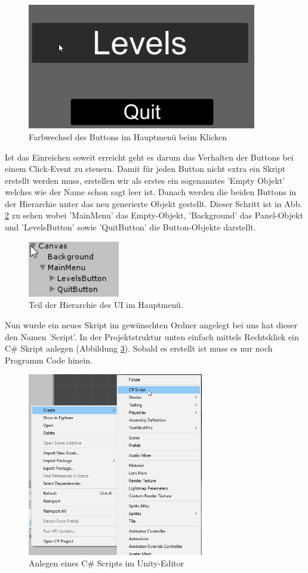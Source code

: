   \begin{figure}[H]
  	\centering
  	\includegraphics[width=10cm]{images/ButtonsClicked.png}
  	\caption{Farbwechsel des Buttons im Hauptmenü beim Klicken}
  	\label{ButtonClicked}
  \end{figure}

Ist das Einreichen soweit erreicht geht es darum das Verhalten der Buttons bei einem Click-Event zu steuern. Damit für jeden Button nicht extra ein Skript erstellt werden muss, erstellen wir als erstes ein sogenanntes 'Empty Objekt' welches wie der Name schon sagt leer ist. Danach werden die beiden Buttons in der Hierarchie unter das neu generierte Objekt gestellt. Dieser Schritt ist in Abb. \ref{MainMenuEmpty} zu sehen wobei 'MainMenu' das Empty-Objekt, 'Background' das Panel-Objekt und 'LevelsButton' sowie 'QuitButton' die Button-Objekte darstellt.

\begin{figure}[H]
	\includegraphics[width=4cm]{images/MainMenuEmpty.png}
	\caption{Teil der Hierarchie des UI im Hauptmenü.}
	\label{MainMenuEmpty}
\end{figure}
Nun wurde ein neues Skript im gewünschten Ordner angelegt bei uns hat dieser den Namen 'Script'. In der Projektstruktur unten einfach mittels Rechtsklick ein C\# Skript anlegen (Abbildung \ref{addScript}). Sobald es erstellt ist muss es nur noch Programm Code hinein.

\begin{figure}[H]
	\includegraphics[height=8cm]{images/addScript.png}
	\caption{Anlegen eines C\# Scripts im Unity-Editor}
	\label{addScript}
\end{figure}

